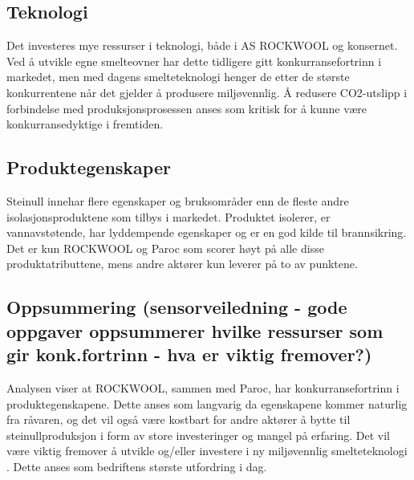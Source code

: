 \subsection{Teknologi}
Det investeres mye ressurser i teknologi, både i AS ROCKWOOL og konsernet. Ved å utvikle egne smelteovner har dette tidligere gitt konkurransefortrinn i markedet, men med dagens smelteteknologi henger de etter de største konkurrentene når det gjelder å produsere miljøvennlig. Å redusere CO2-utslipp i forbindelse med produksjonsprosessen anses som kritisk for å kunne være konkurransedyktige i fremtiden.

\subsection{Produktegenskaper}
Steinull innehar flere egenskaper og bruksområder enn de fleste andre isolasjonsproduktene som tilbys i markedet. Produktet isolerer, er vannavstøtende, har lyddempende egenskaper og er en god kilde til brannsikring. Det er kun ROCKWOOL og Paroc som scorer høyt på alle disse produktatributtene, mens andre aktører kun leverer på to av punktene.  

\subsection{Oppsummering (sensorveiledning - gode oppgaver oppsummerer hvilke ressurser som gir konk.fortrinn - hva er viktig fremover?)}
Analysen viser at ROCKWOOL, sammen med Paroc, har konkurransefortrinn i produktegenskapene. Dette anses som langvarig da egenskapene kommer naturlig fra råvaren, og det vil også være kostbart for andre aktører å bytte til steinullproduksjon i form av store investeringer og mangel på erfaring. Det vil være viktig fremover å utvikle og/eller investere i ny miljøvennlig smelteteknologi . Dette anses som bedriftens største utfordring i dag.